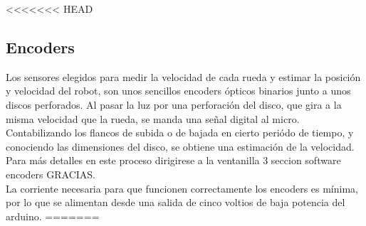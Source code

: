 <<<<<<< HEAD
\subsection{Encoders}
Los sensores elegidos para medir la velocidad de cada rueda y estimar la posición y velocidad del robot, son unos sencillos encoders ópticos binarios junto a unos discos perforados. Al pasar la luz por una perforación del disco, que gira a la misma velocidad que la rueda, se manda una señal digital al micro. Contabilizando los flancos de subida o de bajada en cierto periódo de tiempo, y conociendo las dimensiones del disco, se obtiene una estimación de la velocidad. Para más detalles en este proceso dirigirese a la ventanilla 3 seccion software encoders GRACIAS. \\
La corriente necesaria para que funcionen correctamente los encoders es mínima, por lo que se alimentan desde una salida de cinco voltios de baja potencia del arduino.
=======
